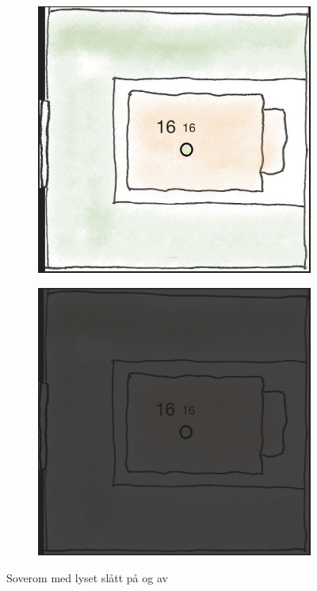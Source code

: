 \begin{figure}[ht]
\centering
\begin{subfigure}{0.32\textwidth}
\centering
\includegraphics[scale=0.1]{fig/bedroom}
\caption{}
\label{fig:bedroomon}
\end{subfigure}
\begin{subfigure}{0.32\textwidth}
\centering
\includegraphics[scale=0.1]{fig/bedroom2}
\caption{}
\label{fig:bedroomoff}
\end{subfigure}
\caption{Soverom med lyset slått på og av}
\label{fig:bedroomonoff}
\end{figure}
